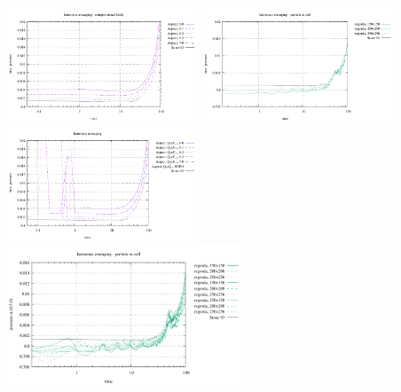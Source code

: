 \begin{center}
\includegraphics[width=5.7cm]{images/stokes_sphere_fs2D/max_pressure_harm_comp}
\includegraphics[width=5.7cm]{images/stokes_sphere_fs2D/max_pressure_harm_pic}
\includegraphics[width=5.7cm]{images/stokes_sphere_fs2D/max_pressure_harm_add}\\
\includegraphics[width=7cm]{images/stokes_sphere_fs2D/p_bottom}
\end{center}

